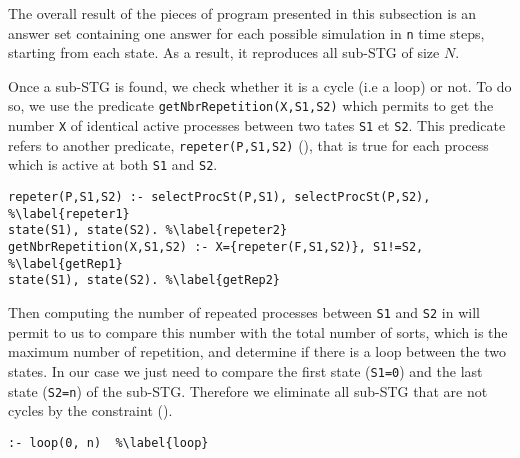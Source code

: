 The overall result of the pieces of program presented in this subsection
is an answer set containing one answer for each
possible simulation in \texttt{n} time steps,
starting from each state.
As a result, it reproduces all sub-STG of size $N$.

Once a sub-STG is found, we check whether it is a cycle (i.e a loop) or not. 
To do so, we use the predicate \texttt{getNbrRepetition(X,S1,S2)} which permits to get the number \texttt{X} of identical active processes between two tates \texttt{S1} et \texttt{S2}. This predicate refers to another predicate, \texttt{repeter(P,S1,S2)} (), that is true for each process which is active at both \texttt{S1} and \texttt{S2}. 
\begin{lstlisting}
repeter(P,S1,S2) :- selectProcSt(P,S1), selectProcSt(P,S2), %\label{repeter1}
state(S1), state(S2). %\label{repeter2}
getNbrRepetition(X,S1,S2) :- X={repeter(F,S1,S2)}, S1!=S2, %\label{getRep1}
state(S1), state(S2). %\label{getRep2}
\end{lstlisting}
Then computing the number of repeated processes between \texttt{S1} and \texttt{S2} in  will permit to us to compare this number with the total number of sorts, which is the maximum number of repetition, and determine if there is a loop between the two states. In our case we just need to compare the first state (\texttt{S1=0}) and the last state (\texttt{S2=n}) of the sub-STG. Therefore we eliminate all sub-STG that are not cycles by the constraint ().
\begin{lstlisting}
:- loop(0, n)  %\label{loop}
\end{lstlisting}

